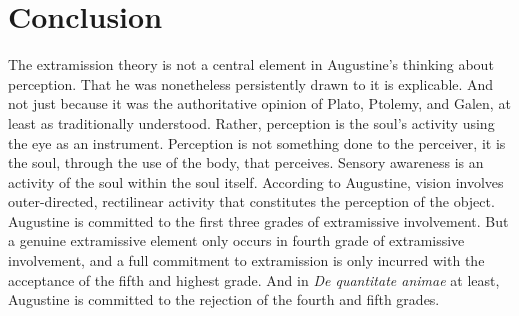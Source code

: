 \documentclass[12pt]{article}
\begin{document}


\section{Conclusion} %
\label{sec:conclusion}

The extramission theory is not a central element in Augustine’s thinking about perception. That he was nonetheless persistently drawn to it is explicable. And not just because it was the authoritative opinion of Plato, Ptolemy, and Galen, at least as traditionally understood. Rather, perception is the soul’s activity using the eye as an instrument. Perception is not something done to the perceiver, it is the soul, through the use of the body, that perceives. Sensory awareness is an activity of the soul within the soul itself. According to Augustine, vision involves outer-directed, rectilinear activity that constitutes the perception of the object. Augustine is committed to the first three grades of extramissive involvement. But a genuine extramissive element only occurs in fourth grade of extramissive involvement, and a full commitment to extramission is only incurred with the acceptance of the fifth and highest grade. And in \emph{De quantitate animae} at least, Augustine is committed to the rejection of the fourth and fifth grades.






\nocite{Tourscher:1933rw}
\nocite{Dodds:1963ul}
\nocite{Migne:1845aa}
\nocite{Migne:1856aa}
\nocite{Lacy:1980mk}
\nocite{Castellote:1978qe}
\nocite{Sorabji:1997ly}
\nocite{Guagliardo:1996aa}
\nocite{Wright:1981zr}
\nocite{Inwood:2001ve}
\nocite{Diels:1974aa}



\end{document}

